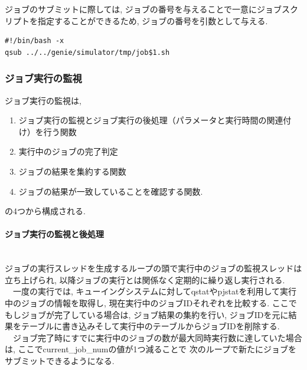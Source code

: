 ジョブのサブミットに際しては, ジョブの番号を与えることで一意にジョブスクリプトを指定することができるため,
ジョブの番号を引数として与える.\\
{\footnotesize
\begin{lstlisting}[title=ジョブのサブミットスクリプト, frame=single]
#!/bin/bash -x
qsub ../../genie/simulator/tmp/job$1.sh
\end{lstlisting}
}

\subsubsection{ジョブ実行の監視}
ジョブ実行の監視は,
\begin{enumerate}
\item ジョブ実行の監視とジョブ実行の後処理（パラメータと実行時間の関連付け）を行う関数
\item 実行中のジョブの完了判定
\item ジョブの結果を集約する関数
\item ジョブの結果が一致していることを確認する関数.
\end{enumerate}
の4つから構成される.\\
\paragraph{ジョブ実行の監視と後処理}~\\

ジョブの実行スレッドを生成するループの頭で実行中のジョブの監視スレッドは立ち上げられ,
以降ジョブの実行とは関係なく定期的に繰り返し実行される.\\
　一度の実行では, キューイングシステムに対してqstatやpjstatを利用して実行中のジョブの情報を取得し,
現在実行中のジョブIDそれぞれを比較する. ここでもしジョブが完了している場合は,
ジョブ結果の集約を行い, ジョブIDを元に結果をテーブルに書き込みそして実行中のテーブルからジョブIDを削除する.\\
　ジョブ完了時にすでに実行中のジョブの数が最大同時実行数に達していた場合は, ここでcurrent\_job\_numの値が1つ減ることで
次のループで新たにジョブをサブミットできるようになる.\\

